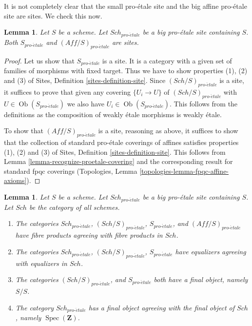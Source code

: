 \documentclass{stacks-project}
\theoremstyle{plain}
\newtheorem{lemma}[subsection]{Lemma}
\theoremstyle{definition}
\theoremstyle{remark}
\numberwithin{equation}{subsection}
\def\Spec{\mathop{\mathrm{Spec}}}
\def\Sch{\mathit{Sch}}
\def\Ob{\mathop{\mathrm{Ob}}\nolimits}
\def\proetale{{pro\text{-}\acute{e}tale}}
\begin{document}
\noindent
It is not completely clear that the small pro-\'etale site and
the big affine pro-\'etale site are sites. We check this now.

\begin{lemma}
\label{lemma-verify-site-proetale}
Let $S$ be a scheme. Let $\Sch_\proetale$ be a big pro-\'etale site
containing $S$. Both $S_\proetale$ and $(\textit{Aff}/S)_\proetale$ are sites.
\end{lemma}

\begin{proof}
Let us show that $S_\proetale$ is a site. It is a category with a
given set of families of morphisms with fixed target. Thus we
have to show properties (1), (2) and (3) of
Sites, Definition \ref{sites-definition-site}.
Since $(\Sch/S)_\proetale$ is a site, it suffices to prove
that given any covering $\{U_i \to U\}$ of $(\Sch/S)_\proetale$
with $U \in \Ob(S_\proetale)$ we also have $U_i \in \Ob(S_\proetale)$.
This follows from the definitions
as the composition of weakly \'etale morphisms is weakly \'etale.

\medskip\noindent
To show that $(\textit{Aff}/S)_\proetale$ is a site, reasoning as above,
it suffices to show that the collection of standard pro-\'etale coverings
of affines satisfies properties (1), (2) and (3) of
Sites, Definition \ref{sites-definition-site}.
This follows from Lemma \ref{lemma-recognize-proetale-covering}
and the corresponding result for standard fpqc coverings
(Topologies, Lemma \ref{topologies-lemma-fpqc-affine-axioms}).
\end{proof}

\begin{lemma}
\label{lemma-fibre-products-proetale}
Let $S$ be a scheme. Let $\Sch_\proetale$ be a big pro-\'etale
site containing $S$. Let $\Sch$ be the category of all schemes.
\begin{enumerate}
\item The categories $\Sch_\proetale$, $(\Sch/S)_\proetale$,
$S_\proetale$, and $(\textit{Aff}/S)_\proetale$ have fibre products
agreeing with fibre products in $\Sch$.
\item The categories $\Sch_\proetale$, $(\Sch/S)_\proetale$,
$S_\proetale$ have equalizers agreeing with equalizers in $\Sch$.
\item The categories $(\Sch/S)_\proetale$, and $S_\proetale$ both have
a final object, namely $S/S$.
\item The category $\Sch_\proetale$ has a final object agreeing
with the final object of $\Sch$, namely $\Spec(\mathbf{Z})$.
\end{enumerate}
\end{lemma}
\end{document}
